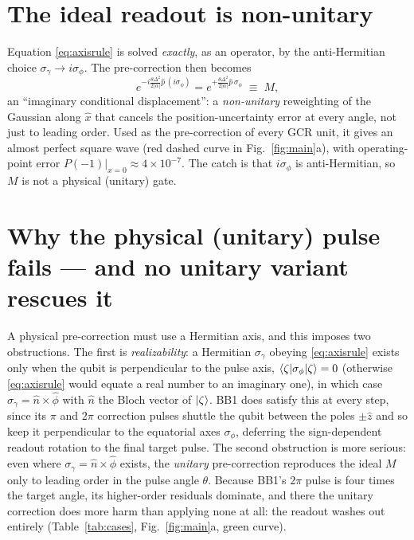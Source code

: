 \documentclass[11pt]{article}
\begin{document}
\section{The ideal readout is non-unitary}\label{sec:ideal}
Equation \eqref{eq:axisrule} is solved \emph{exactly}, as an operator, by the anti-Hermitian
choice $\sigma_\gamma\to i\sigma_\phi$. The pre-correction then becomes
\begin{equation}
e^{-i\frac{\theta\Delta^2}{2|\alpha|}\hat p\,(i\sigma_\phi)}
= e^{+\frac{\theta\Delta^2}{2|\alpha|}\hat p\,\sigma_\phi}\;\equiv\;M,
\label{eq:ideal}
\end{equation}
an ``imaginary conditional displacement'': a \emph{non-unitary} reweighting of the Gaussian along
$\hat x$ that cancels the position-uncertainty error at every angle, not just to leading order. Used
as the pre-correction of every GCR unit, it gives an almost perfect square wave (red dashed curve in
Fig.~\ref{fig:main}a), with operating-point error $P(-1)|_{x=0}\approx 4\times10^{-7}$. The catch is
that $i\sigma_\phi$ is anti-Hermitian, so $M$ is not a physical (unitary) gate.

\section{Why the physical (unitary) pulse fails --- and no unitary variant rescues it}\label{sec:no-unitary-fix}
A physical pre-correction must use a Hermitian axis, and this imposes two obstructions. The first is
\emph{realizability}: a Hermitian $\sigma_\gamma$ obeying \eqref{eq:axisrule} exists only when the qubit
is perpendicular to the pulse axis, $\braket{\zeta|\sigma_\phi|\zeta}=0$ (otherwise \eqref{eq:axisrule}
would equate a real number to an imaginary one), in which case $\sigma_\gamma=\hat n\times\hat\phi$ with
$\hat n$ the Bloch vector of $\ket{\zeta}$. BB1 does satisfy this at every step, since its $\pi$ and
$2\pi$ correction pulses shuttle the qubit between the poles $\pm\hat z$ and so keep it perpendicular to
the equatorial axes $\sigma_\phi$, deferring the sign-dependent readout rotation to the final target
pulse. The second obstruction is more serious: even where $\sigma_\gamma=\hat n\times\hat\phi$ exists,
the \emph{unitary} pre-correction reproduces the ideal $M$ only to leading order in the pulse angle
$\theta$. Because BB1's $2\pi$ pulse is four times the target angle, its higher-order residuals
dominate, and there the unitary correction does more harm than applying none at all: the readout washes
out entirely (Table~\ref{tab:cases}, Fig.~\ref{fig:main}a, green curve).
\end{document}
